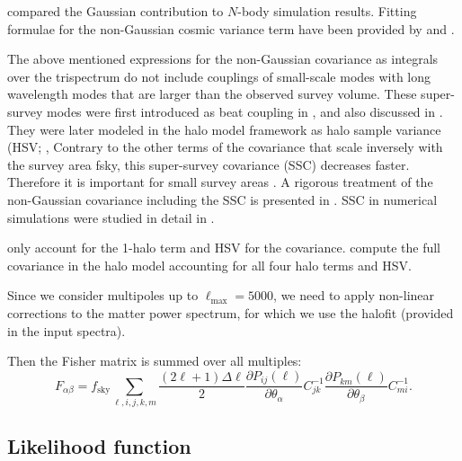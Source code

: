 \cite{WH00} compared the Gaussian contribution to $N$-body simulation results.
Fitting formulae for the non-Gaussian cosmic variance term have been provided
by \cite{2010A&A...514A..79P} and \cite{2011ApJ...734...76S}.

The above mentioned expressions for the non-Gaussian covariance as integrals
over the trispectrum do not include couplings of small-scale modes with long
wavelength modes that are larger than the observed survey volume. These
super-survey modes were first introduced as beat coupling in
\cite{2006MNRAS.371.1188H}, and also discussed in \cite{2009MNRAS.395.2065T}.
They were later modeled in the halo model framework as halo sample variance
(HSV; \cite{2009ApJ...701..945S}, \cite{2013MNRAS.429..344K} Contrary to the
other terms of the covariance that scale inversely with the survey area fsky,
this super-survey covariance (SSC) decreases faster. Therefore it is important for
small survey areas \cite{2009ApJ...701..945S}. A rigorous treatment of the
non-Gaussian covariance including the SSC is presented in
\cite{2013PhRvD..87l3504T}. SSC in numerical simulations were studied in detail 
in \cite{2014PhRvD..89h3519L}.

\cite{2013MNRAS.429..344K} only account for the 1-halo term and HSV for the
covariance. \cite{2013arXiv1302.2401E} compute the full covariance in the halo
model accounting for all four halo terms and HSV.



Since we consider multipoles up to $\ell_{\mathrm{max}}=5000$,
we need to apply non-linear corrections to the matter power spectrum,
for which we use the halofit (provided in the input spectra).

Then the Fisher matrix is summed over all multiples:
\begin{equation}
F_{\alpha\beta}=f_{\mathrm{sky}}\sum\limits _{\ell,i,j,k,m}\frac{(2\ell+1)\Delta\ell}{2}\frac{\partial P_{ij}(\ell)}{\partial\theta_{\alpha}}C_{jk}^{-1}\frac{\partial P_{km}(\ell)}{\partial\theta_{\beta}}C_{mi}^{-1}\label{eq:fm-wl}.
\end{equation}


\subsection{Likelihood function}

